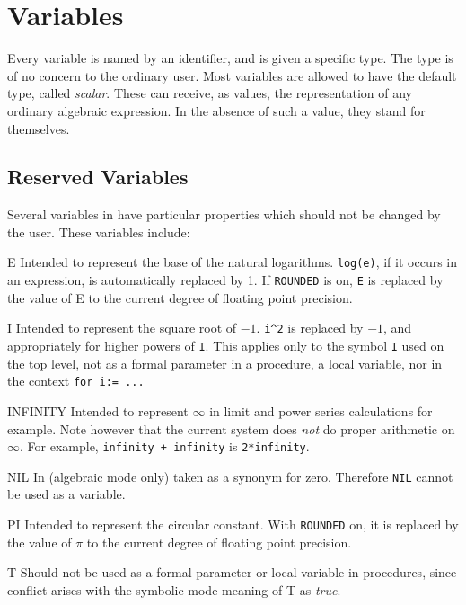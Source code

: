 \section{Variables}

Every variable is named by an identifier, and is given a
specific type.  The type is of no concern to the ordinary user.  Most
variables are allowed to have the default type, called {\em scalar}.
These can receive, as values, the representation of any ordinary algebraic
expression.  In the absence of such a value, they stand for themselves.

\subsection*{Reserved Variables}

Several variables in {\REDUCE} have particular
properties which should not be changed by the user.  These variables
include:

\begin{list}{}{\renewcommand{\makelabel}[1]{{\tt#1}\hspace{\fill}}%
               \settowidth{\labelwidth}{\tt INFINITY}%
               \setlength{\labelsep}{1em}%
               }
\item[E] Intended to represent the base of
the natural logarithms.  {\tt log(e)}, if it occurs in an expression, is
automatically replaced by 1.  If {\tt ROUNDED} is
on, {\tt E} is replaced by the value of E to the current degree of
floating point precision.

\item[I] Intended to represent the square
root of $-1$. {\tt i\verb|^|2} is replaced by $-1$, and appropriately for higher
powers of {\tt I}.  This applies only to the symbol {\tt I} used on the top
level, not as a formal parameter in a procedure, a local variable, nor in
the context {\tt for i:= ...}

\item[INFINITY] Intended to represent $\infty$
in limit and power series calculations for example.  Note however that the
current system does {\em not\/} do proper arithmetic on $\infty$.  For example,
{\tt infinity + infinity} is {\tt 2*infinity}.

\item[NIL] In {\REDUCE} (algebraic mode only)
taken as a synonym for zero.  Therefore {\tt NIL} cannot be used as a
variable.

\item[PI] Intended to represent the circular
constant.  With {\tt ROUNDED} on, it is replaced by the value of $\pi$ to
the current degree of floating point precision.

\item[T] Should not be used as a formal
parameter or local variable in procedures, since conflict arises with the
symbolic mode meaning of T as {\em true}.
\end{list}

